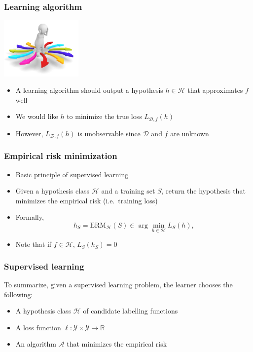 \documentclass[10pt]{beamer}
\begin{document}
\begin{frame}
  \frametitle{Learning algorithm}
  \begin{center}
	\includegraphics[height=3cm]{images/choices.jpg}
  \end{center}
  \begin{itemize}
	\item A learning algorithm should output a hypothesis $h\in\mathcal{H}$ that approximates $f$ well
	\item We would like $h$ to minimize the true loss $L_{\mathcal{D},f}(h)$
	\item However, $L_{\mathcal{D},f}(h)$ is {\color{red} unobservable} since $\mathcal{D}$ and $f$ are unknown
  \end{itemize}
\end{frame}

\begin{frame}
  \frametitle{Empirical risk minimization}
  \begin{itemize}
	\item Basic principle of supervised learning
	\item Given a hypothesis class $\mathcal{H}$ and a training set $S$, return the hypothesis that {\color{red} minimizes the empirical risk} (i.e.~training loss)
	\item Formally,
	\[
	h_S=\mathrm{ERM}_\mathcal{H}(S) \in \arg\min_{h\in\mathcal{H}}L_S(h),
	\]
	\item Note that if $f\in\mathcal{H}$, $L_S(h_S)=0$
  \end{itemize}
\end{frame}

\begin{frame}
  \frametitle{Supervised learning}
  To summarize, given a supervised learning problem, the learner chooses the following:
  \begin{itemize}
	\item A hypothesis class $\mathcal{H}$ of candidate labelling functions
	\item A loss function $\ell:\mathcal{Y}\times\mathcal{Y}\rightarrow \mathbb{R}$
	\item An algorithm $\mathcal{A}$ that minimizes the empirical risk
  \end{itemize}
\end{frame}
\end{document}
